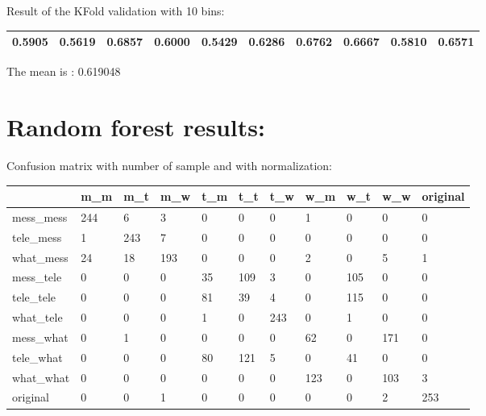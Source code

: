 Result of the KFold validation with 10 bins:
 {\def\arraystretch{1.3} 
 \begin{table}[H] 
\centering 
\begin{tabular}{|l |l |l |l |l |l |l |l |l |l |}  
\hline 
0.5905&
0.5619&
0.6857&
0.6000&
0.5429&
0.6286&
0.6762&
0.6667&
0.5810&
0.6571\\ \hline  

\end{tabular} 
\end{table} }

The mean is : 0.619048\section{Random forest results:} 
Confusion matrix with number of sample and with normalization:
 {\def\arraystretch{1.3} 
 \begin{table}[H] 
\centering 
\begin{tabular}{|l|l|l|l|l|l|l|l|l|l|l|} 
\hline 
  &m\_m  &m\_t  &m\_w  &t\_m  &t\_t  &t\_w  &w\_m  &w\_t  &w\_w  &original  \\ \hline
mess\_mess  &244  &6  &3  &0  &0  &0  &1  &0  &0  &0  \\ \hline
tele\_mess  &1  &243  &7  &0  &0  &0  &0  &0  &0  &0  \\ \hline
what\_mess  &24  &18  &193  &0  &0  &0  &2  &0  &5  &1  \\ \hline
mess\_tele  &0  &0  &0  &35  &109  &3  &0  &105  &0  &0  \\ \hline
tele\_tele  &0  &0  &0  &81  &39  &4  &0  &115  &0  &0  \\ \hline
what\_tele  &0  &0  &0  &1  &0  &243  &0  &1  &0  &0  \\ \hline
mess\_what  &0  &1  &0  &0  &0  &0  &62  &0  &171  &0  \\ \hline
tele\_what  &0  &0  &0  &80  &121  &5  &0  &41  &0  &0  \\ \hline
what\_what  &0  &0  &0  &0  &0  &0  &123  &0  &103  &3  \\ \hline
original  &0  &0  &1  &0  &0  &0  &0  &0  &2  &253  \\ \hline
\end{tabular} 
\end{table} }

